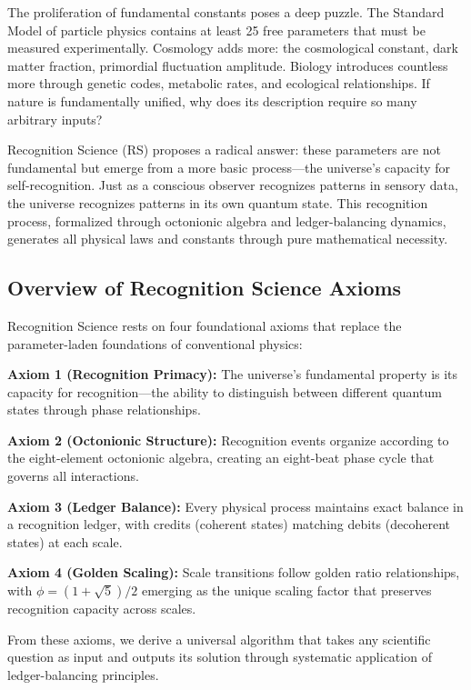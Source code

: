 \documentclass[12pt,a4paper]{article}
\begin{document}
The proliferation of fundamental constants poses a deep puzzle. The Standard Model of particle physics contains at least 25 free parameters that must be measured experimentally. Cosmology adds more: the cosmological constant, dark matter fraction, primordial fluctuation amplitude. Biology introduces countless more through genetic codes, metabolic rates, and ecological relationships. If nature is fundamentally unified, why does its description require so many arbitrary inputs?

Recognition Science (RS) proposes a radical answer: these parameters are not fundamental but emerge from a more basic process—the universe's capacity for self-recognition. Just as a conscious observer recognizes patterns in sensory data, the universe recognizes patterns in its own quantum state. This recognition process, formalized through octonionic algebra and ledger-balancing dynamics, generates all physical laws and constants through pure mathematical necessity.

\subsection{Overview of Recognition Science Axioms}

Recognition Science rests on four foundational axioms that replace the parameter-laden foundations of conventional physics:

\textbf{Axiom 1 (Recognition Primacy):} The universe's fundamental property is its capacity for recognition—the ability to distinguish between different quantum states through phase relationships.

\textbf{Axiom 2 (Octonionic Structure):} Recognition events organize according to the eight-element octonionic algebra, creating an eight-beat phase cycle that governs all interactions.

\textbf{Axiom 3 (Ledger Balance):} Every physical process maintains exact balance in a recognition ledger, with credits (coherent states) matching debits (decoherent states) at each scale.

\textbf{Axiom 4 (Golden Scaling):} Scale transitions follow golden ratio relationships, with $\phi = (1+\sqrt{5})/2$ emerging as the unique scaling factor that preserves recognition capacity across scales.

From these axioms, we derive a universal algorithm that takes any scientific question as input and outputs its solution through systematic application of ledger-balancing principles.
\end{document}

